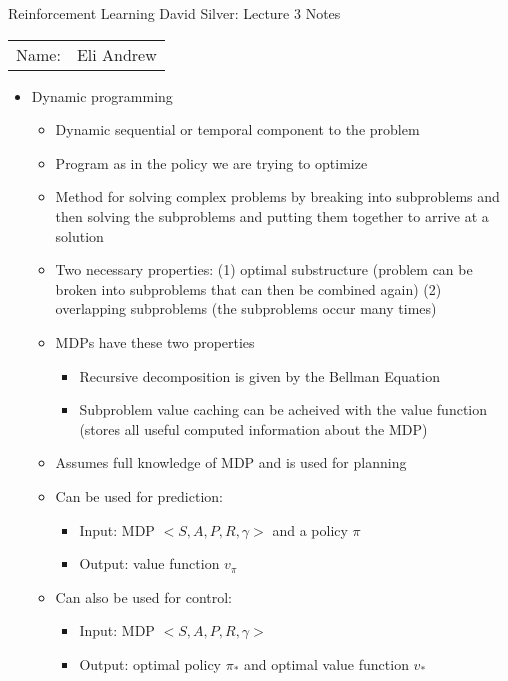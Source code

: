 \documentclass[12pt]{article}
\begin{document}
\begin{center}
{\Large Reinforcement Learning David Silver: Lecture 3 Notes}

\begin{tabular}{rl}
Name: & Eli Andrew
\end{tabular}
\end{center}

  \begin{itemize}
    \item Dynamic programming
    \begin{itemize}
      \item Dynamic sequential or temporal component to the problem
      \item Program as in the policy we are trying to optimize
      \item Method for solving complex problems by breaking into subproblems
      and then solving the subproblems and putting them together to arrive at a solution
      \item Two necessary properties: (1) optimal substructure (problem can be broken into 
      subproblems that can then be combined again) (2) overlapping subproblems (the subproblems
      occur many times)
      \item MDPs have these two properties 
      \begin{itemize}
        \item Recursive decomposition is given by the Bellman Equation
        \item Subproblem value caching can be acheived with the value function
        (stores all useful computed information about the MDP)
      \end{itemize}
      \item Assumes full knowledge of MDP and is used for planning
      \item Can be used for prediction:
      \begin{itemize}
        \item Input: MDP $<S, A, P, R, \gamma>$ and a policy $\pi$
        \item Output: value function $v_\pi$
      \end{itemize}
      \item Can also be used for control:
      \begin{itemize}
        \item Input: MDP $<S, A, P, R, \gamma>$ 
        \item Output: optimal policy $\pi_*$ and optimal value function $v_*$
      \end{itemize}

\end{itemize}
\end{itemize}
\end{document}
